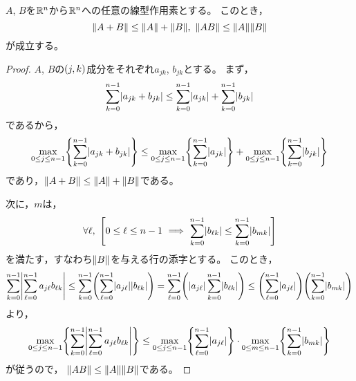 \documentclass[b5paper,oneside,openany]{ltjsbook} %
\begin{document}
\begin{prop}
    $A$, $B$を$\mathbb{R}^n$から$\mathbb{R}^n$への任意の線型作用素とする。
    このとき，
    \begin{equation}
        \norm{A+B}\leq \norm{A}+\norm{B},\ \norm{AB}\leq \norm{A}\norm{B}
    \end{equation}
    が成立する。
    \begin{proof}
        $A$, $B$の$\pare{j,k}$成分をそれぞれ$a_{jk}$, $b_{jk}$とする。
        まず，
        \begin{equation}
            \sum_{k=0}^{n-1}\abs{a_{jk}+b_{jk}}
            \leq \sum_{k=0}^{n-1}\abs{a_{jk}}
            +\sum_{k=0}^{n-1}\abs{b_{jk}}
        \end{equation}
        であるから，
        \begin{equation}
            \max_{0\leq j\leq n-1}\bra{\sum_{k=0}^{n-1}\abs{a_{jk}+b_{jk}}}
            \leq \max_{0\leq j\leq n-1}\bra{\sum_{k=0}^{n-1}\abs{a_{jk}}}
            +\max_{0\leq j\leq n-1}\bra{\sum_{k=0}^{n-1}\abs{b_{jk}}}
        \end{equation}
        であり，$\norm{A+B}\leq \norm{A}+\norm{B}$である。
        
        次に，$m$は，
        \begin{equation}
            \forall \ell,\ \squ{
                0\leq \ell \leq n-1\ \Longrightarrow \ 
                \sum_{k=0}^{n-1}\abs{b_{\ell k}}\leq
                \sum_{k=0}^{n-1}\abs{b_{m k}}
            }
        \end{equation}
        を満たす，すなわち$\norm{B}$を与える行の添字とする。
        このとき，
        \begin{equation}
            \sum_{k=0}^{n-1}\abs{\sum_{\ell=0}^{n-1}a_{j\ell}b_{\ell k}}
            \leq \sum_{k=0}^{n-1}\pare{\sum_{\ell=0}^{n-1}\abs{a_{j\ell}}\abs{b_{\ell k}}}
            =\sum_{\ell=0}^{n-1}\pare{\abs{a_{j\ell}}\sum_{k=0}^{n-1}\abs{b_{\ell k}}}
            \leq \pare{\sum_{\ell=0}^{n-1}\abs{a_{j\ell}}}
            \pare{\sum_{k=0}^{n-1}\abs{b_{mk}}}
        \end{equation}
        より，
        \begin{equation}
            \max_{0\leq j\leq n-1}\bra{\sum_{k=0}^{n-1}\abs{\sum_{\ell=0}^{n-1}a_{j\ell}b_{\ell k}}}
            \leq \max_{0\leq j\leq n-1}\bra{\sum_{\ell=0}^{n-1}\abs{a_{j\ell}}}\cdot \max_{0\leq m\leq n-1}\bra{\sum_{k=0}^{n-1}\abs{b_{mk}}}
        \end{equation}
        が従うので，
        $\norm{AB}\leq \norm{A}\norm{B}$である。
    \end{proof}
\end{prop}
\end{document}
